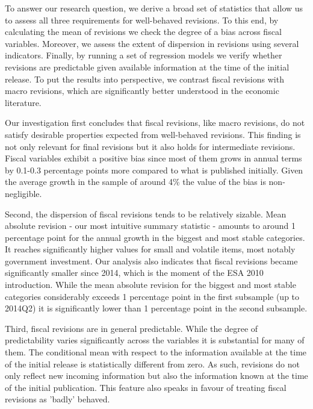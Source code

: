 

To answer our research question, we derive a broad set of statistics that allow us to assess all three requirements for well-behaved revisions. To this end, by calculating the mean of revisions we check the degree of a bias across fiscal variables. Moreover, we assess the extent of dispersion in revisions using several indicators. Finally, by running a set of regression models we verify whether revisions are predictable given available information at the time of the initial release. To put the results into perspective, we contrast fiscal revisions with macro revisions, which are significantly better understood in the economic literature.

Our investigation first concludes that fiscal revisions, like macro revisions, do not satisfy desirable properties expected from well-behaved revisions. This finding is not only relevant for final revisions but it also holds for intermediate revisions. Fiscal variables exhibit a positive bias since most of them grows in annual terms by 0.1-0.3 percentage points more compared to what is published initially. Given the average growth in the sample of around 4\% the value of the bias is non-negligible.

Second, the dispersion of fiscal revisions tends to be relatively sizable. Mean absolute revision - our most intuitive summary statistic - amounts to around 1 percentage point for the annual growth in the biggest and most stable categories. It reaches significantly higher values for small and volatile items, most notably government investment. Our analysis also indicates that fiscal revisions became significantly smaller since 2014, which is the moment of the ESA 2010 introduction. While the mean absolute revision for the biggest and most stable categories considerably exceeds 1 percentage point in the first subsample (up to 2014Q2) it is significantly lower than 1 percentage point in the second subsample.

Third, fiscal revisions are in general predictable. While the degree of predictability varies significantly across the variables it is substantial for many of them. The conditional mean with respect to the information available at the time of the initial release is statistically different from zero. As such, revisions do not only reflect new incoming information but also the information known at the time of the initial publication. This feature also speaks in favour of treating fiscal revisions as 'badly' behaved.

